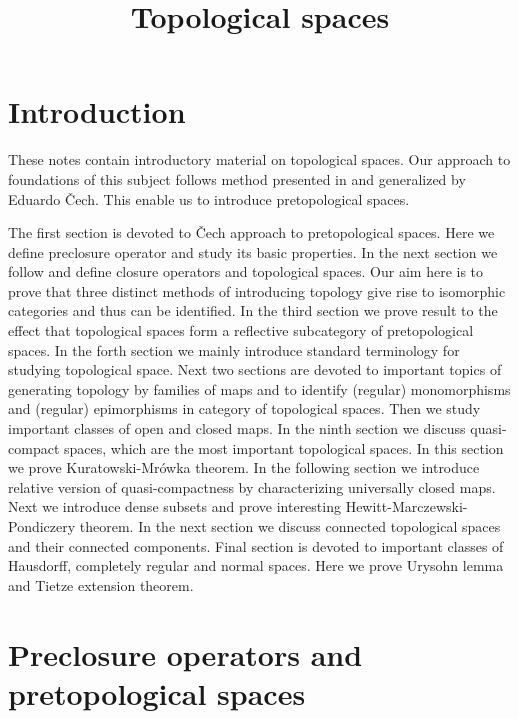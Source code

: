 



\title{Topological spaces}
\date{}
\maketitle

\section{Introduction}
\noindent
These notes contain introductory material on topological spaces. Our approach to foundations of this subject follows method presented in \cite{kuratowski1922operation} and generalized by Eduardo \v{C}ech. This enable us to introduce pretopological spaces.

The first section is devoted to \v{C}ech approach to pretopological spaces. Here we define preclosure operator and study its basic properties. In the next section we follow \cite{kuratowski1922operation} and define closure operators and topological spaces. Our aim here is to prove that three distinct methods of introducing topology give rise to isomorphic categories and thus can be identified. In the third section we prove result to the effect that topological spaces form a reflective subcategory of pretopological spaces. In the forth section we mainly introduce standard terminology for studying topological space. Next two sections are devoted to important topics of generating topology by families of maps and to identify (regular) monomorphisms and (regular) epimorphisms in category of topological spaces. Then we study important classes of open and closed maps. In the ninth section we discuss quasi-compact spaces, which are the most important topological spaces. In this section we prove Kuratowski-Mrówka theorem. In the following section we introduce relative version of quasi-compactness by characterizing universally closed maps. Next we introduce dense subsets and prove interesting Hewitt-Marczewski-Pondiczery theorem. In the next section we discuss connected topological spaces and their connected components. Final section is devoted to important classes of Hausdorff, completely regular and normal spaces. Here we prove Urysohn lemma and Tietze extension theorem.

\section{Preclosure operators and pretopological spaces}


